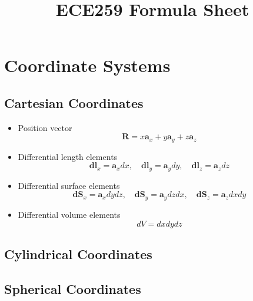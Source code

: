 \documentclass{article}
\title{ECE259 Formula Sheet}
\begin{document}
    \section{Coordinate Systems}
    \subsection{Cartesian Coordinates}
    \begin{definition}
        \begin{itemize}
            \item Position vector
            \begin{equation}
                \mathbf{R} = x \mathbf{a}_x + y \mathbf{a}_y + z \mathbf{a}_z
            \end{equation}
            \item Differential length elements
            \begin{equation}
                \mathbf{dl}_x = \mathbf{a}_x dx, \quad \mathbf{dl}_y = \mathbf{a}_y dy, \quad \mathbf{dl}_z = \mathbf{a}_z dz
            \end{equation}
            \item Differential surface elements 
            \begin{equation}
                \mathbf{dS}_x = \mathbf{a}_x dy dz, \quad \mathbf{dS}_y = \mathbf{a}_y dz dx, \quad \mathbf{dS}_z = \mathbf{a}_z dx dy
            \end{equation}
            \item Differential volume elements
            \begin{equation}
                dV = dx dy dz
            \end{equation}
        \end{itemize}
    \end{definition}

    \subsection{Cylindrical Coordinates}
    \begin{definition}
        
    \end{definition}

    \subsection{Spherical Coordinates}
    \begin{definition}
        
    \end{definition}
\end{document}
